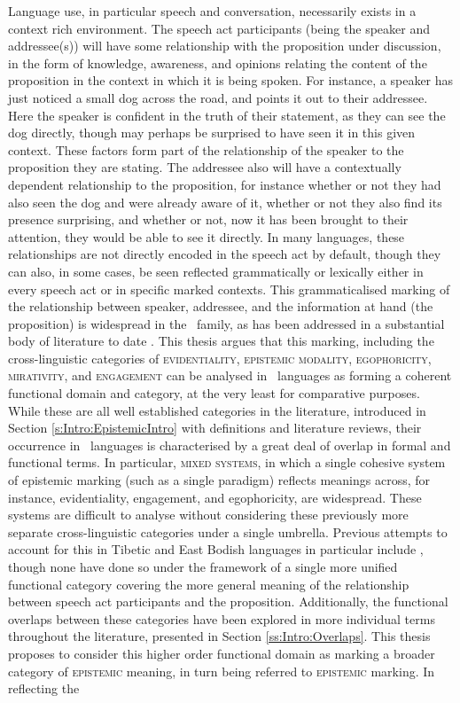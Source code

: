 Language use, in particular speech and conversation, necessarily exists in a context rich environment. The speech act participants (being the speaker and addressee(s)) will have some relationship with the proposition under discussion, in the form of knowledge, awareness, and opinions relating the content of the proposition in the context in which it is being spoken. For instance, a speaker has just noticed a small dog across the road, and points it out to their addressee. Here the speaker is confident in the truth of their statement, as they can see the dog directly, though may perhaps be surprised to have seen it in this given context. These factors form part of the relationship of the speaker to the proposition they are stating. The addressee also will have a contextually dependent relationship to the proposition, for instance whether or not they had also seen the dog and were already aware of it, whether or not they also find its presence surprising, and whether or not, now it has been brought to their attention, they would be able to see it directly. In many languages, these relationships are not directly encoded in the speech act by default, though they can also, in some cases, be seen reflected grammatically or lexically either in every speech act or in specific marked contexts. This grammaticalised marking of the relationship between speaker, addressee, and the information at hand (the proposition) is widespread in the \lfam\ family, as has been addressed in a substantial body of literature to date \cites{Aikhenvald2004}{Hill2017}. This thesis argues that this marking, including the cross-linguistic categories of \textsc{evidentiality}, \textsc{epistemic modality}, \textsc{egophoricity}, \textsc{mirativity}, and \textsc{engagement} can be analysed in \lfam\ languages as forming a coherent functional domain and category, at the very least for comparative purposes. While these are all well established categories in the literature, introduced in Section \ref{s:Intro:EpistemicIntro} with definitions and literature reviews, their occurrence in \lfam\ languages is characterised by a great deal of overlap in formal and functional terms. In particular, \textsc{mixed systems}, in which a single cohesive system of epistemic marking (such as a single paradigm) reflects meanings across, for instance, evidentiality, engagement, and egophoricity, are widespread. These systems are difficult to analyse without considering these previously more separate cross-linguistic categories under a single umbrella. Previous attempts to account for this in Tibetic and East Bodish languages in particular include , though none have done so under the framework of a single more unified functional category covering the more general meaning of the relationship between speech act participants and the proposition. Additionally, the functional overlaps between these categories have been explored in more individual terms throughout the literature, presented in Section \ref{ss:Intro:Overlaps}. This thesis proposes to consider this higher order functional domain as marking a broader category of \textsc{epistemic} meaning, in turn being referred to \textsc{epistemic} marking. In reflecting the 